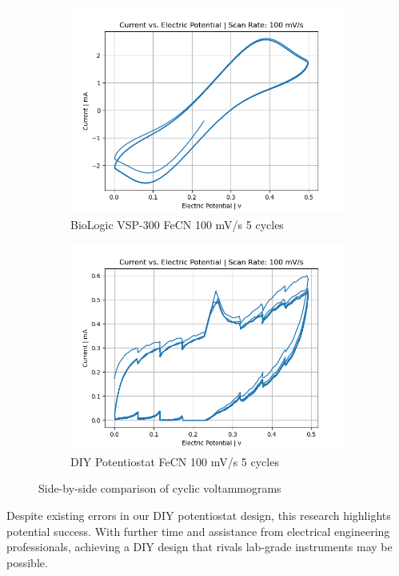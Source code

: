 \documentclass{article}
\begin{document}
\begin{figure}[H]
  \begin{subfigure}[b]{0.45\textwidth}
    \includegraphics[width=\textwidth]{FECN_100mVs_5cycles_lab.png}
    \caption{BioLogic VSP-300 FeCN 100 mV/s 5 cycles}
  \end{subfigure}
  \hfill
  \begin{subfigure}[b]{0.45\textwidth}
    \includegraphics[width=\textwidth]{FECN_100mVs_5cycles.png}
    \caption{DIY Potentiostat FeCN 100 mV/s 5 cycles}
  \end{subfigure}
  
  \caption{Side-by-side comparison of cyclic voltammograms}
\end{figure}

Despite existing errors in our DIY potentiostat design, this research highlights potential success. With further time and assistance from electrical engineering professionals, achieving a DIY design that rivals lab-grade instruments may be possible.
\end{document}
